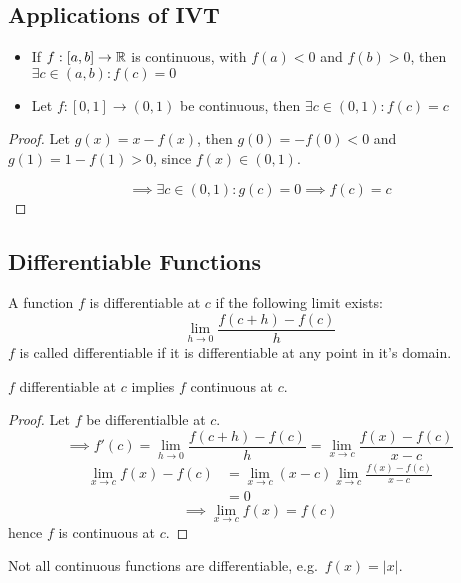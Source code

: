 \documentclass[a4paper,10pt]{article}
\begin{document}
\subsection{Applications of IVT}

\begin{itemize}
	\item If $f:[a,b] \to \mathbb{R}$ is continuous, with $f(a) < 0$ and
		$f(b) > 0$, then $\exists c \in (a,b) : f(c) = 0$
	\item Let $f:[0,1] \to (0,1)$ be continuous, then
		$\exists c \in (0,1): f(c) = c$
\end{itemize}

\begin{proof}
	Let $g(x) = x - f(x)$, then $g(0) = -f(0) < 0$ and $g(1) = 1 - f(1) > 0$,
	since $f(x) \in (0,1)$.

	\[ \implies \exists c \in (0,1) : g(c) = 0 \implies f(c) = c \]
\end{proof}

\subsection{Differentiable Functions}

\begin{defn}[Differentiable]
	A function $f$ is differentiable at $c$ if the following limit exists:
	\[ \lim_{h \to 0} \frac{f(c+h) - f(c)}{h} \]
	$f$ is called differentiable if it is differentiable at any point in it's domain.
\end{defn}

\begin{lemma}
	$f$ differentiable at $c$ implies $f$ continuous at $c$.
\end{lemma}

\begin{proof}
	Let $f$ be differentialble at $c$.
	\[
		\implies f'(c) = \lim_{h \to 0} \frac{f(c+h) - f(c)}{h}
		= \lim_{x \to c} \frac{f(x) - f(c)}{x-c}
	\]
	\begin{align*}
		\lim_{x \to c} f(x) - f(c)
		&= \lim_{x \to c}(x-c) \lim_{x \to c} \frac{f(x) - f(c)}{x-c} \\
		&= 0
	\end{align*}
	\[
		\implies \lim_{x \to c} f(x) = f(c)
	\]
	hence $f$ is continuous at $c$.
\end{proof}

\begin{rem}
	Not all continuous functions are differentiable, e.g.\ $f(x) = |x|$.
\end{rem}
\end{document}
